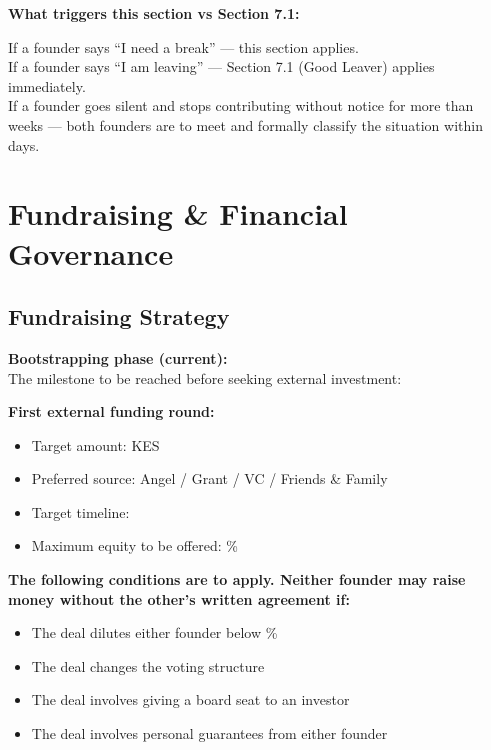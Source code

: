 \documentclass[12pt,a4paper]{article}
\newcommand{\blank}[1][5.5cm]{\underline{\hspace{#1}}}
\begin{document}
\noindent\textbf{What triggers this section vs Section 7.1:}

If a founder says ``I need a break'' --- this section applies.\\
If a founder says ``I am leaving'' --- Section 7.1 (Good Leaver) applies immediately.\\
If a founder goes silent and stops contributing without notice for more than \blank[1.5cm] weeks --- both founders are to meet and formally classify the situation within \blank[1.5cm] days.

\section{Fundraising \& Financial Governance}

\subsection{Fundraising Strategy}

\noindent\textbf{Bootstrapping phase (current):}\\
The milestone to be reached before seeking external investment: \blank[7cm]

\medskip
\noindent\textbf{First external funding round:}
\begin{itemize}
  \item Target amount: KES \blank[4cm]
  \item Preferred source: \quad Angel \;/\; Grant \;/\; VC \;/\; Friends \& Family
  \item Target timeline: \blank[4cm]
  \item Maximum equity to be offered: \blank[2cm]\%
\end{itemize}

\noindent\textbf{The following conditions are to apply. Neither founder may raise money without the other's written agreement if:}

\begin{itemize}
  \item The deal dilutes either founder below \blank[2cm]\%
  \item The deal changes the voting structure
  \item The deal involves giving a board seat to an investor
  \item The deal involves personal guarantees from either founder
\end{itemize}
\end{document}
